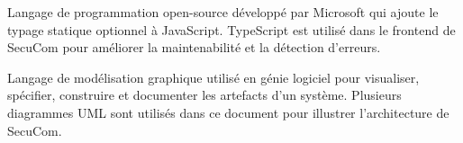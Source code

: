 \begin{description}[leftmargin=2cm, style=nextline]
\item[TypeScript] Langage de programmation open-source développé par Microsoft qui ajoute le typage statique optionnel à JavaScript. TypeScript est utilisé dans le frontend de SecuCom pour améliorer la maintenabilité et la détection d'erreurs.

\item[UML (Unified Modeling Language)] Langage de modélisation graphique utilisé en génie logiciel pour visualiser, spécifier, construire et documenter les artefacts d'un système. Plusieurs diagrammes UML sont utilisés dans ce document pour illustrer l'architecture de SecuCom.

\end{description}
